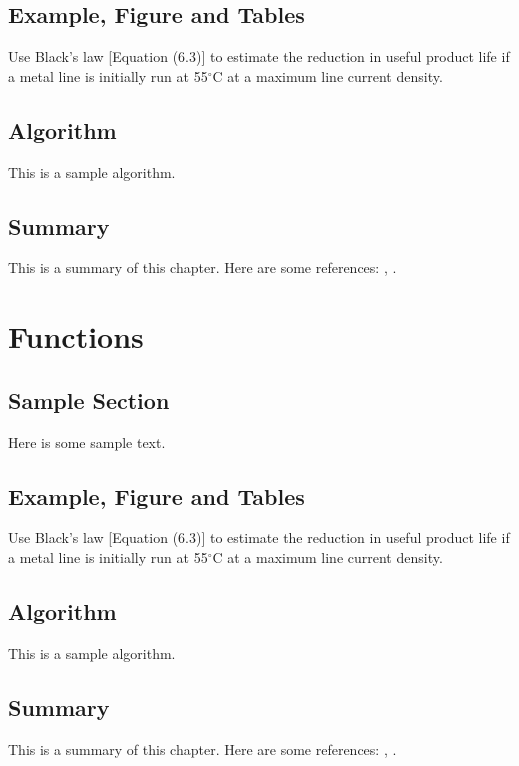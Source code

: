 \documentclass{wileySix}
\begin{document}
\section{Example, Figure and Tables}
\vskip6pt
\begin{example}
	Use Black's law [Equation (6.3)] to estimate the reduction in useful product
	life if a metal line is initially run at 55$^\circ$C at a maximum line
	current density.
\end{example}

\section{Algorithm}
This is a sample algorithm.

\section{Summary}
This is a summary of this chapter.
Here are some references: \cite{xkilby}, \cite{xberen}.

\chapter{Functions}

\section{Sample Section}
Here is some sample text.

\section{Example, Figure and Tables}
\vskip6pt
\begin{example}
	Use Black's law [Equation (6.3)] to estimate the reduction in useful product
	life if a metal line is initially run at 55$^\circ$C at a maximum line
	current density.
\end{example}

\section{Algorithm}
This is a sample algorithm.

\section{Summary}
This is a summary of this chapter.
Here are some references: \cite{xkilby}, \cite{xberen}.
\end{document}
